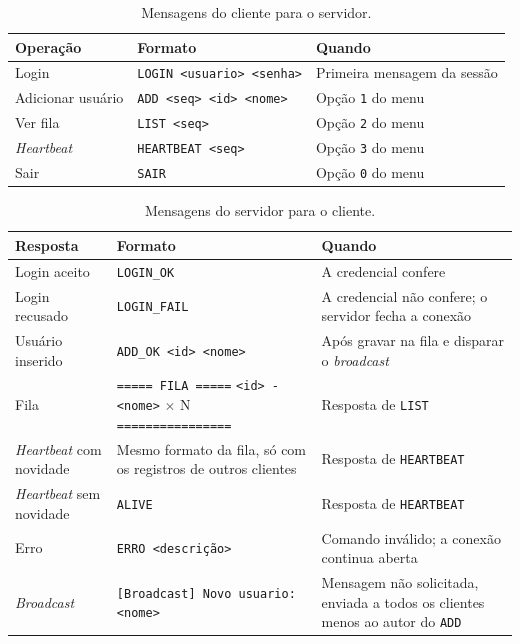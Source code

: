 \documentclass[12pt,a4paper]{article}
\begin{document}
\begin{table}[H]
\centering
\caption{Mensagens do cliente para o servidor.}
\footnotesize
\begin{tabular}{L{3.2cm} L{5.6cm} L{4.4cm}}
\toprule
\textbf{Operação} & \textbf{Formato} & \textbf{Quando} \\
\midrule
Login & \texttt{LOGIN <usuario> <senha>} & Primeira mensagem da sessão \\
Adicionar usuário & \texttt{ADD <seq> <id> <nome>} & Opção \texttt{1} do menu \\
Ver fila & \texttt{LIST <seq>} & Opção \texttt{2} do menu \\
\textit{Heartbeat} & \texttt{HEARTBEAT <seq>} & Opção \texttt{3} do menu \\
Sair & \texttt{SAIR} & Opção \texttt{0} do menu \\
\bottomrule
\end{tabular}
\end{table}

\begin{table}[H]
\centering
\caption{Mensagens do servidor para o cliente.}
\footnotesize
\begin{tabular}{L{3.2cm} L{5.6cm} L{4.4cm}}
\toprule
\textbf{Resposta} & \textbf{Formato} & \textbf{Quando} \\
\midrule
Login aceito & \texttt{LOGIN\_OK} & A credencial confere \\
Login recusado & \texttt{LOGIN\_FAIL} & A credencial não confere; o servidor fecha a conexão \\
Usuário inserido & \texttt{ADD\_OK <id> <nome>} & Após gravar na fila e disparar o \textit{broadcast} \\
Fila & \texttt{===== FILA =====} \newline \texttt{<id> - <nome>} $\times$ N \newline \texttt{================} & Resposta de \texttt{LIST} \\
\textit{Heartbeat} com novidade & Mesmo formato da fila, só com os registros de outros clientes & Resposta de \texttt{HEARTBEAT} \\
\textit{Heartbeat} sem novidade & \texttt{ALIVE} & Resposta de \texttt{HEARTBEAT} \\
Erro & \texttt{ERRO <descrição>} & Comando inválido; a conexão continua aberta \\
\midrule
\textit{Broadcast} & \texttt{[Broadcast] Novo usuario: <nome>} & Mensagem não solicitada, enviada a todos os clientes menos ao autor do \texttt{ADD} \\
\bottomrule
\end{tabular}
\end{table}
\end{document}
